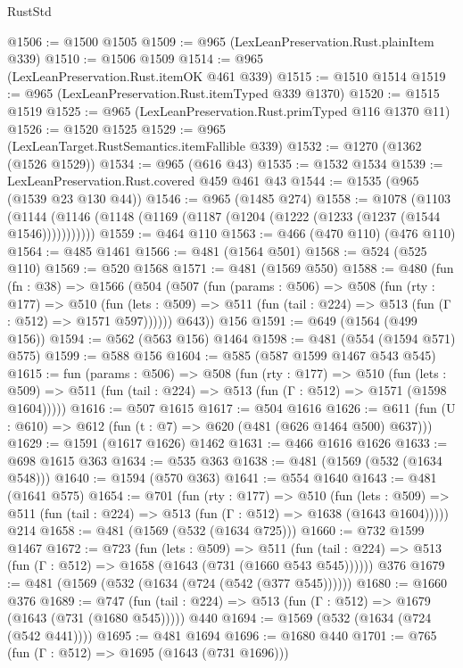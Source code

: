 \begin{lexlean}{RustStd}
\begin{coremodule}
@1506 := @1500 @1505
@1509 := @965 (LexLeanPreservation.Rust.plainItem @339)
@1510 := @1506 @1509
@1514 := @965 (LexLeanPreservation.Rust.itemOK @461 @339)
@1515 := @1510 @1514
@1519 := @965 (LexLeanPreservation.Rust.itemTyped @339 @1370)
@1520 := @1515 @1519
@1525 := @965 (LexLeanPreservation.Rust.primTyped @116 @1370 @11)
@1526 := @1520 @1525
@1529 := @965 (LexLeanTarget.RustSemantics.itemFallible @339)
@1532 := @1270 (@1362 (@1526 @1529))
@1534 := @965 (@616 @43)
@1535 := @1532 @1534
@1539 := LexLeanPreservation.Rust.covered @459 @461 @43
@1544 := @1535 (@965 (@1539 @23 @130 @44))
@1546 := @965 (@1485 @274)
@1558 := @1078
    (@1103 (@1144 (@1146 (@1148 (@1169 (@1187 (@1204 (@1222 (@1233 (@1237 (@1544 @1546)))))))))))
@1559 := @464 @110
@1563 := @466 (@470 @110) (@476 @110)
@1564 := @485 @1461
@1566 := @481 (@1564 @501)
@1568 := @524 (@525 @110)
@1569 := @520 @1568
@1571 := @481 (@1569 @550)
@1588 := @480
    (fun (fn : @38) =>
    @1566
      (@504
        (@507
          (fun (params : @506) =>
          @508
            (fun (rty : @177) =>
            @510
              (fun (lets : @509) =>
              @511 (fun (tail : @224) => @513 (fun (Γ : @512) => @1571 @597))))))
        @643))
    @156
@1591 := @649 (@1564 (@499 @156))
@1594 := @562 (@563 @156) @1464
@1598 := @481 (@554 (@1594 @571) @575)
@1599 := @588 @156
@1604 := @585 (@587 @1599 @1467 @543 @545)
@1615 := fun (params : @506) =>
  @508
    (fun (rty : @177) =>
    @510
      (fun (lets : @509) =>
      @511 (fun (tail : @224) => @513 (fun (Γ : @512) => @1571 (@1598 @1604)))))
@1616 := @507 @1615
@1617 := @504 @1616
@1626 := @611 (fun (U : @610) => @612 (fun (t : @7) => @620 (@481 (@626 @1464 @500) @637)))
@1629 := @1591 (@1617 @1626) @1462
@1631 := @466 @1616 @1626
@1633 := @698 @1615 @363
@1634 := @535 @363
@1638 := @481 (@1569 (@532 (@1634 @548)))
@1640 := @1594 (@570 @363)
@1641 := @554 @1640
@1643 := @481 (@1641 @575)
@1654 := @701
    (fun (rty : @177) =>
    @510
      (fun (lets : @509) =>
      @511 (fun (tail : @224) => @513 (fun (Γ : @512) => @1638 (@1643 @1604)))))
    @214
@1658 := @481 (@1569 (@532 (@1634 @725)))
@1660 := @732 @1599 @1467
@1672 := @723
    (fun (lets : @509) =>
    @511 (fun (tail : @224) => @513 (fun (Γ : @512) => @1658 (@1643 (@731 (@1660 @543 @545))))))
    @376
@1679 := @481 (@1569 (@532 (@1634 (@724 (@542 (@377 @545))))))
@1680 := @1660 @376
@1689 := @747 (fun (tail : @224) => @513 (fun (Γ : @512) => @1679 (@1643 (@731 (@1680 @545))))) @440
@1694 := @1569 (@532 (@1634 (@724 (@542 @441))))
@1695 := @481 @1694
@1696 := @1680 @440
@1701 := @765 (fun (Γ : @512) => @1695 (@1643 (@731 @1696)))

\end{coremodule}
\end{lexlean}

